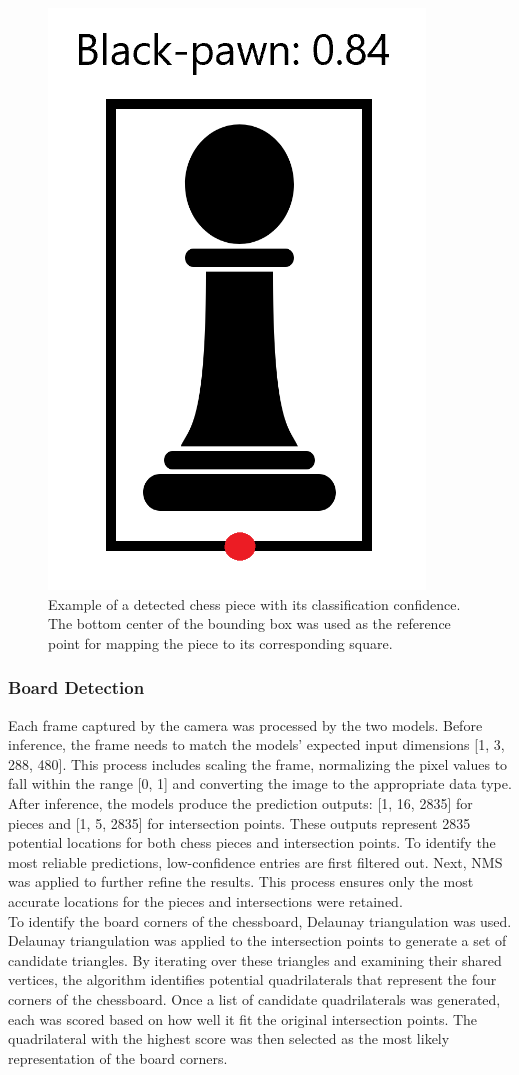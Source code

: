 \newpage

\begin{figure}[h!]
    \centering
    \includegraphics[width=0.25\linewidth]{figures/methods/ml-models/black-pawn.png}
    \caption[FIX]{Example of a detected chess piece with its classification confidence. The bottom center of the bounding box was used as the reference point for mapping the piece to its corresponding square. \cite{svgrepo:black-pawn-svg}}
    \label{fig:bbox-black-pawn}
\end{figure}


\subsubsection*{Board Detection}

Each frame captured by the camera was processed by the two models. Before inference, the frame needs to match the models’ expected input dimensions [1, 3, 288, 480]. This process includes scaling the frame, normalizing the pixel values to fall within the range [0, 1] and converting the image to the appropriate data type. \\

After inference, the models produce the prediction outputs: [1, 16, 2835] for pieces and [1, 5, 2835] for intersection points. These outputs represent 2835 potential locations for both chess pieces and intersection points. To identify the most reliable predictions, low-confidence entries are first filtered out. Next, NMS was applied to further refine the results. This process ensures only the most accurate locations for the pieces and intersections were retained. \\

To identify the board corners of the chessboard, Delaunay triangulation was used. Delaunay triangulation was applied to the intersection points to generate a set of candidate triangles. By iterating over these triangles and examining their shared vertices, the algorithm identifies potential quadrilaterals that represent the four corners of the chessboard. Once a list of candidate quadrilaterals was generated, each was scored based on how well it fit the original intersection points. The quadrilateral with the highest score was then selected as the most likely representation of the board corners.
\\

